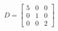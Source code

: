 \documentclass[preview]{standalone}
\begin{document}
\begin{align*}
D=\left[\begin{matrix}5&0&0\\0&1&0\\0&0&2\end{matrix}\right]
\end{align*}
\end{document}

